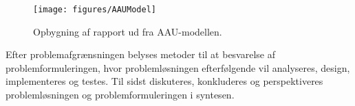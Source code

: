 \begin{figure} [H]
\centering
\texttt{[image: figures/AAUModel]}
\caption{Opbygning af rapport ud fra AAU-modellen. }
\label{fig:AAUModel}
\end{figure} 

Efter problemafgrænsningen belyses metoder til at besvarelse af  problemformuleringen, hvor problemløsningen efterfølgende vil analyseres, design, implementeres og testes. Til sidst diskuteres, konkluderes og perspektiveres problemløsningen og problemformuleringen i syntesen. 

